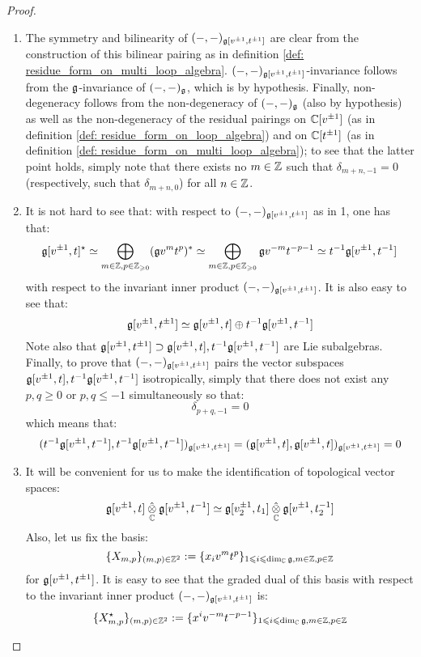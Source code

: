                 \begin{proof}
                    \begin{enumerate}
                        \item The symmetry and bilinearity of $(-, -)_{\mathfrak{g}[v^{\pm 1}, t^{\pm 1}]}$ are clear from the construction of this bilinear pairing as in definition \ref{def: residue_form_on_multi_loop_algebra}. $(-, -)_{\mathfrak{g}[v^{\pm 1}, t^{\pm 1}]}$-invariance follows from the $\mathfrak{g}$-invariance of $(-, -)_{\mathfrak{g}}$, which is by hypothesis. Finally, non-degeneracy follows from the non-degeneracy of $(-, -)_{\mathfrak{g}}$ (also by hypothesis) as well as the non-degeneracy of the residual pairings on $\mathbb{C}[v^{\pm 1}]$ (as in definition \ref{def: residue_form_on_loop_algebra}) and on $\mathbb{C}[t^{\pm 1}]$ (as in definition \ref{def: residue_form_on_multi_loop_algebra}); to see that the latter point holds, simply note that there exists no $m \in \mathbb{Z}$ such that $\delta_{m + n, - 1} = 0$ (respectively, such that $\delta_{m + n, 0}$) for all $n \in \mathbb{Z}$.
                        \item It is not hard to see that: with respect to $(-, -)_{\mathfrak{g}[v^{\pm 1}, t^{\pm 1}]}$ as in 1, one has that:
                            $$\mathfrak{g}[v^{\pm 1}, t]^{\star} \simeq \bigoplus_{m \in \mathbb{Z}, p \in \mathbb{Z}_{\geqslant 0}} (\mathfrak{g} v^m t^p)^* \simeq \bigoplus_{m \in \mathbb{Z}, p \in \mathbb{Z}_{\geqslant 0}} \mathfrak{g} v^{-m} t^{-p - 1} \simeq t^{-1}\mathfrak{g}[v^{\pm 1}, t^{-1}]$$
                        with respect to the invariant inner product $(-, -)_{\mathfrak{g}[v^{\pm 1}, t^{\pm 1}]}$. It is also easy to see that:
                            $$\mathfrak{g}[v^{\pm 1}, t^{\pm 1}] \simeq \mathfrak{g}[v^{\pm 1}, t] \oplus t^{-1}\mathfrak{g}[v^{\pm 1}, t^{-1}]$$
                        Note also that $\mathfrak{g}[v^{\pm 1}, t^{\pm 1}] \supset \mathfrak{g}[v^{\pm 1}, t], t^{-1}\mathfrak{g}[v^{\pm 1}, t^{-1}]$ are Lie subalgebras. Finally, to prove that $(-, -)_{\mathfrak{g}[v^{\pm 1}, t^{\pm 1}]}$ pairs the vector subspaces $\mathfrak{g}[v^{\pm 1}, t], t^{-1}\mathfrak{g}[v^{\pm 1}, t^{-1}]$ isotropically, simply that there does not exist any $p, q \geq 0$ or $p, q \leq -1$ simultaneously so that:
                            $$\delta_{p + q, -1} = 0$$
                        which means that:
                            $$(t^{-1}\mathfrak{g}[v^{\pm 1}, t^{-1}], t^{-1}\mathfrak{g}[v^{\pm 1}, t^{-1}])_{\mathfrak{g}[v^{\pm 1}, t^{\pm 1}]} = (\mathfrak{g}[v^{\pm 1}, t], \mathfrak{g}[v^{\pm 1}, t])_{\mathfrak{g}[v^{\pm 1}, t^{\pm 1}]} = 0$$
                        \item It will be convenient for us to make the identification of topological vector spaces:
                            $$\g[v^{\pm 1}, t] \hattensor_{\bbC} \g[v^{\pm 1}, t^{-1}] \cong \g[v_2^{\pm 1}, t_1] \hattensor_{\bbC} \g[v^{\pm 1}, t_2^{-1}]$$
                        Also, let us fix the basis:
                            $$\{X_{m, p}\}_{(m, p) \in \mathbb{Z}^2} := \{x_i v^m t^p\}_{1 \leqslant i \leqslant \dim_{\mathbb{C}} \mathfrak{g}, m \in \mathbb{Z}, p \in \mathbb{Z}}$$
                        for $\mathfrak{g}[v^{\pm 1}, t^{\pm 1}]$. It is easy to see that the graded dual of this basis with respect to the invariant inner product $(-, -)_{\mathfrak{g}[v^{\pm 1}, t^{\pm 1}]}$ is:
                            $$\{X_{m, p}^{\star}\}_{(m, p) \in \mathbb{Z}^2} := \{x^i v^{-m} t^{-p - 1}\}_{1 \leqslant i \leqslant \dim_{\mathbb{C}} \mathfrak{g}, m \in \mathbb{Z}, p \in \mathbb{Z}}$$
                        

\end{enumerate}
\end{proof}
